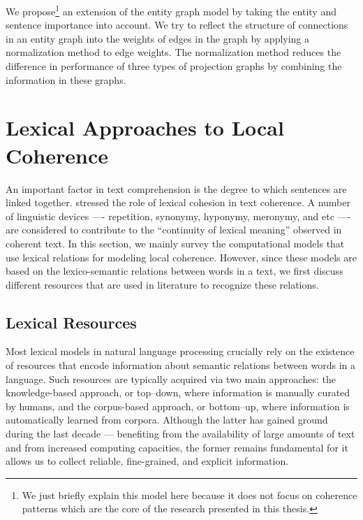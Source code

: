 We propose\footnote{We just briefly explain this model here because it does not focus on coherence patterns which are the core of the research presented in this thesis.} \cite{mesgar14} an extension of the entity graph model by taking the entity and sentence importance into account. 
We try to reflect the structure of connections in an entity graph into the weights of edges in the graph by applying a normalization method to edge weights.  
The normalization method reduces the difference in performance of three types of projection graphs by combining the information in these graphs. 


\section{Lexical Approaches to Local Coherence}

An important factor in text comprehension is the degree to which sentences are linked together. 
 stressed the role of lexical cohesion in text coherence. 
A number of linguistic devices —- repetition, synonymy, hyponymy, meronymy, and etc —- are considered to contribute to the ``continuity of lexical meaning'' observed in coherent text. 
In this section, we mainly survey the computational models that use lexical relations for modeling local coherence. 
However, since these models are based on the lexico-semantic relations between words in a text, we first discuss different resources that are used in literature to recognize these relations. 

\subsection{Lexical Resources} 

Most lexical models in natural language processing crucially rely on the existence of resources that encode information about semantic relations between words in a language. 
Such resources are typically acquired via two main approaches: the knowledge-based approach, or top–down, where information is manually curated by humans, and the corpus-based approach, or bottom–up, where information is automatically learned from corpora. 
Although the latter has gained ground during the last decade — benefiting from the availability of large amounts of text and from increased computing capacities, the former remains fundamental for it allows us to collect reliable, fine-grained, and explicit information. 

